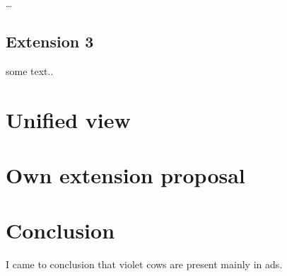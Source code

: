 \documentclass[11pt,oneside,draft]{fithesis2}
\begin{document}
\dots

\section{Extension 3}

some text..

\chapter{Unified view}

\chapter{Own extension proposal}

\chapter{Conclusion}

I came to conclusion that violet cows are present mainly in ads.



\end{document}
